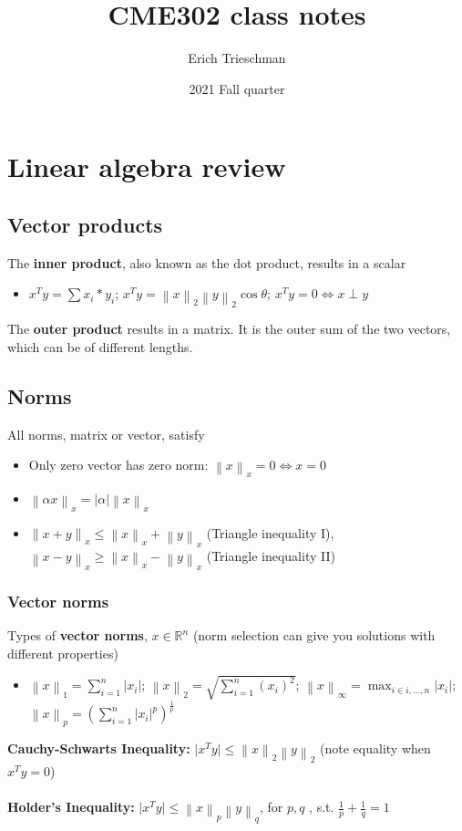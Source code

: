\documentclass{article}
\title{CME302 class notes}
\author{Erich Trieschman}
\date{2021 Fall quarter}
\newcommand{\norm}[2]{\left\lVert#1\right\rVert_#2}
\newcommand{\abs}[1]{\lvert#1\rvert}
\begin{document}
\maketitle

\section{Linear algebra review}

\subsection{Vector products}
The \textbf{inner product}, also known as the dot product, results in a scalar
\begin{itemize}
    \item $x^Ty = \sum x_i*y_i$; $x^Ty = \norm{x}{2}\norm{y}{2}\cos\theta$; $x^Ty = 0 \Leftrightarrow x \perp y$
\end{itemize}
The \textbf{outer product} results in a matrix. It is the outer sum of the two vectors, which can be of different lengths.

\subsection{Norms}
All norms, matrix or vector, satisfy
\begin{itemize}
    \item Only zero vector has zero norm: $\norm{x}{x} = 0 \Leftrightarrow x = 0$
    \item $\norm{\alpha x}{x} = \abs{\alpha}\norm{x}{x}$
    \item $\norm{x+y}{x} \leq \norm{x}{x} + \norm{y}{x}$ (Triangle inequality I), $\norm{x-y}{x} \geq \norm{x}{x} - \norm{y}{x}$ (Triangle inequality II)
\end{itemize}

\subsubsection{Vector norms}
Types of \textbf{vector norms}, $x \in \mathbb{R}^{n}$ (norm selection can give you solutions with different properties)
\begin{itemize}
    \item $\norm{x}{1} = \sum_{i=1}^n \abs{x_i}$; $\norm{x}{2} = \sqrt{\sum_{i=1}^n (x_i)^2}$; $\norm{x}{\infty} = \max_{i \in i,\dots, n} \abs{x_i}$; $\norm{x}{p} = (\sum_{i=1}^n \abs{x_i}^p)^{\frac{1}{p}}$
\end{itemize}
\textbf{Cauchy-Schwarts Inequality:} $\abs{x^Ty}\leq \norm{x}{2}\norm{y}{2}$ (note equality when $x^Ty = 0$)\\ \\
\textbf{Holder's Inequality:} $\abs{x^Ty} \leq \norm{x}{p}\norm{y}{q}$, for $p, q$ , s.t. $\frac{1}{p} + \frac{1}{q} = 1$
\end{document}
